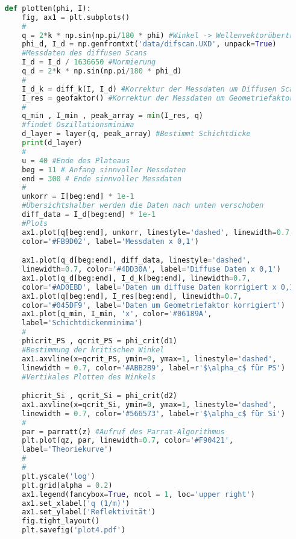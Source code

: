 \begin{lstlisting}[language=Python]
    
    def plotten(phi, I):
        fig, ax1 = plt.subplots()
        #
        q = 2*k * np.sin(np.pi/180 * phi) #Winkel -> Wellenvektorübertrag
        phi_d, I_d = np.genfromtxt('data/difscan.UXD', unpack=True) 
        #Messdaten des diffusen Scans
        I_d = I_d / 1636650 #Normierung
        q_d = 2*k * np.sin(np.pi/180 * phi_d) 
        #
        I_d_k = diff_k(I, I_d) #Korrektur der Messdaten um Diffusen Scan
        I_res = geofaktor() #Korrektur der Messdaten um Geometriefaktor
        #
        q_min , I_min , peak_array = min(I_res, q) 
        #findet Oszillationsminima
        d_layer = layer(q, peak_array) #Bestimmt Schichtdicke
        print(d_layer)
        #
        u = 40 #Ende des Plateaus
        beg = 11 # Anfang sinnvoller Messdaten
        end = 300 # Ende sinnvoller Messdaten
        #
        unkorr = I[beg:end] * 1e-1 
        #Übersichtshalber werden die Daten nach unten verschoben
        diff_data = I_d[beg:end] * 1e-1
        #Plots
        ax1.plot(q[beg:end], unkorr, linestyle='dashed', linewidth=0.7, 
        color='#FB9D02', label='Messdaten x 0,1')

        ax1.plot(q_d[beg:end], diff_data, linestyle='dashed', 
        linewidth=0.7, color='#4DD30A', label='Diffuse Daten x 0,1')
        ax1.plot(q_d[beg:end], I_d_k[beg:end], linewidth=0.7, 
        color='#AD0EBD', label='Daten um diffuse Daten korrigiert x 0,1')
        ax1.plot(q[beg:end], I_res[beg:end], linewidth=0.7, 
        color='#045DF9', label='Daten um Geometriefaktor korrigiert')
        ax1.plot(q_min, I_min, 'x', color='#06189A', 
        label='Schichtdickenminima')
        #
        phicrit_PS , qcrit_PS = phi_crit(d1) 
        #Bestimmung der kritischen Winkel
        ax1.axvline(x=qcrit_PS, ymin=0, ymax=1, linestyle='dashed', 
        linewidth = 0.7, color='#ABB2B9', label=r'$\alpha_c$ für PS') 
        #Vertikales Plotten des Winkels

        phicrit_Si , qcrit_Si = phi_crit(d2)
        ax1.axvline(x=qcrit_Si, ymin=0, ymax=1, linestyle='dashed', 
        linewidth = 0.7, color='#566573', label=r'$\alpha_c$ für Si')
        #
        par = parratt(z) #Aufruf des Parrat-Algorithmus
        plt.plot(qz, par, linewidth=0.7, color='#F90421', 
        label='Theoriekurve')
        #
        #
        plt.yscale('log')
        plt.grid(alpha = 0.2)
        ax1.legend(fancybox=True, ncol = 1, loc='upper right')
        ax1.set_xlabel('q (1/m)')
        ax1.set_ylabel('Reflektivität')
        fig.tight_layout()
        plt.savefig('plot4.pdf')
    

\end{lstlisting}

